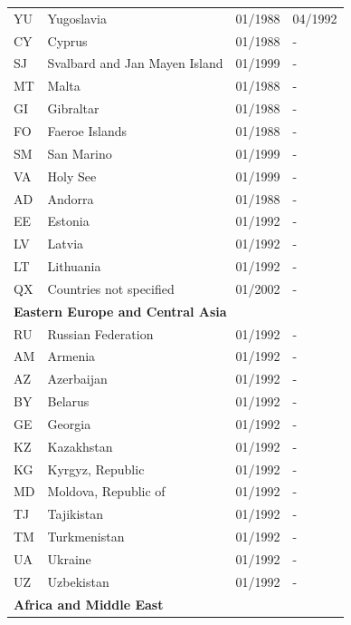 \begin{scriptsize}
\begin{longtable}{lp{8.8cm}p{2cm}p{2cm}}
	YU   &   Yugoslavia                       &   01/1988   &   04/1992  \\
	CY   &   Cyprus                           &   01/1988   &   -  \\
	SJ   &   Svalbard and Jan Mayen Island    &   01/1999   &   -  \\
	MT   &   Malta                            &   01/1988   &   -  \\
	GI   &   Gibraltar                        &   01/1988   &   -  \\
	FO   &   Faeroe Islands                   &   01/1988   &   -  \\
	SM   &   San Marino                       &   01/1999   &   -  \\
	VA   &   Holy See                         &   01/1999   &   -  \\
	AD   &   Andorra                          &   01/1988   &   -  \\
	EE   &   Estonia                          &   01/1992   &   -  \\
	LV   &   Latvia                           &   01/1992   &   -  \\
	LT   &   Lithuania                        &   01/1992   &   -  \\
	QX   &   Countries not specified          &   01/2002   &   -  \\
  \midrule
  \multicolumn{3}{l}{\textbf{Eastern Europe and Central Asia}}  &  \\
	RU & Russian Federation   & 01/1992 & -  \\
	AM & Armenia              & 01/1992 & -  \\
	AZ & Azerbaijan           & 01/1992 & -  \\
	BY & Belarus              & 01/1992 & -  \\
	GE & Georgia              & 01/1992 & -  \\
	KZ & Kazakhstan           & 01/1992 & -  \\
	KG & Kyrgyz, Republic     & 01/1992 & -  \\
	MD & Moldova, Republic of & 01/1992 & -  \\
	TJ & Tajikistan           & 01/1992 & -  \\
	TM & Turkmenistan         & 01/1992 & -  \\
	UA & Ukraine              & 01/1992 & -  \\
	UZ & Uzbekistan           & 01/1992 & -  \\
	\midrule
	\multicolumn{3}{l}{\textbf{Africa and Middle East}}  &  \\

\end{longtable}
\end{scriptsize}
